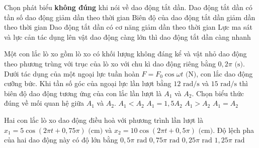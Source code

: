 \begin{ex}	Chọn phát biểu \textbf{không đúng} khi nói về dao động tắt dần.
	\choice
	{\True Dao động tắt dần có tần số dao động giảm dần theo thời gian}
	{Biên độ của dao động tắt dần giảm dần theo thời gian}
	{Dao động tắt dần có cơ năng giảm dần theo thời gian}
	{Lực ma sát và lực cản tác dụng lên vật dao động càng lớn thì dao động tắt dần càng nhanh}
\end{ex}

\begin{ex}	Một con lắc lò xo gồm lò xo có khối lượng không đáng kể và vật nhỏ dao động theo phương trùng với trục của lò xo với chu kì dao động riêng bằng $0,2\pi\text{ (s)}$. Dưới tác dụng của một ngoại lực tuần hoàn $F = F_0\cos\omega t\text{ (N)}$, con lắc dao động cưỡng bức. Khi tần số góc của ngoại lực lần lượt bằng $12\text{ rad/s}$ và $15\text{ rad/s}$ thì biên độ dao động tương ứng của con lắc lần lượt là $A_1$ và $A_2$. Chọn biểu thức đúng về mối quan hệ giữa $A_1$ và $A_2$.
	\choice
	{$A_1 < A_2$}
	{$A_1 = 1,5A_2$}
	{\True $A_1 > A_2$}
	{$A_1 = A_2$}
\end{ex}

\begin{ex}	Hai con lắc lò xo dao động điều hoà với phương trình lần lượt là $x_1 = 5\cos(2\pi t + 0,75\pi)\text{ (cm)}$ và $x_2 = 10\cos(2\pi t + 0,5\pi)\text{ (cm)}$. Độ lệch pha của hai dao động này có độ lớn bằng
	\choice
	{$0,5\pi\text{ rad}$}
	{$0,75\pi\text{ rad}$}
	{\True $0,25\pi\text{ rad}$}
	{$1,25\pi\text{ rad}$}
\end{ex}

